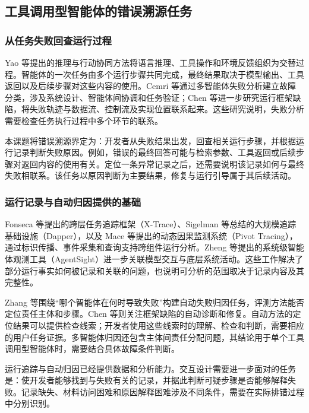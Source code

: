\subsection{工具调用型智能体的错误溯源任务}

\subsubsection{从任务失败回查运行过程}

Yao 等\cite{yao2023react}提出的推理与行动协同方法将语言推理、工具操作和环境反馈组织为交替过程。智能体的一次任务由多个运行步骤共同完成，最终结果取决于模型输出、工具返回以及后续步骤对这些内容的使用。Cemri 等\cite{cemri2025mast}通过多智能体失败分析建立故障分类，涉及系统设计、智能体间协调和任务验证；Chen 等\cite{ref20}进一步研究运行框架缺陷，将失败轨迹与数据流、控制流及实现位置联系起来。这些研究说明，失败分析需要检查任务执行过程中多个环节的联系。

本课题将错误溯源界定为：开发者从失败结果出发，回查相关运行步骤，并根据运行记录判断失败原因。例如，错误的最终回答可能与检索参数、工具返回或后续步骤对返回内容的使用有关。定位一条异常记录之后，还需要说明该记录如何与最终失败相联系。该任务以原因判断为主要结果，修复与运行引导属于其后续活动。

\subsubsection{运行记录与自动归因提供的基础}

Fonseca 等\cite{ref30}提出的跨层任务追踪框架（X-Trace）、Sigelman 等\cite{ref32}总结的大规模追踪基础设施（Dapper），以及 Mace 等\cite{ref31}提出的动态因果监测系统（Pivot Tracing），通过标识传播、事件采集和查询支持跨组件运行分析。Zheng 等\cite{ref19}提出的系统级智能体观测工具（AgentSight）进一步关联模型交互与底层系统活动。这些工作解决了部分运行事实如何被记录和关联的问题，也说明可分析的范围取决于记录内容及其完整性。

Zhang 等\cite{ref03}围绕“哪个智能体在何时导致失败”构建自动失败归因任务，评测方法能否定位责任主体和步骤。Chen 等\cite{ref20}则关注框架缺陷的自动诊断和修复。自动方法的定位结果可以提供检查线索；开发者使用这些线索时的理解、检查和判断，需要相应的用户任务证据。多智能体归因还包含主体间责任分配问题，其结论用于单个工具调用型智能体时，需要结合具体故障条件判断。

运行追踪与自动归因已经提供数据和分析能力。交互设计需要进一步面对的任务是：使开发者能够找到与失败有关的记录，并据此判断可疑步骤是否能够解释失败。记录缺失、材料访问困难和原因解释困难涉及不同条件，需要在实际排错过程中分别识别。

